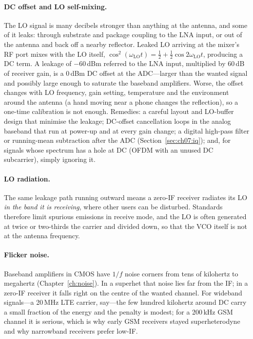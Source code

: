 \paragraph{DC offset and LO self-mixing.} The LO signal is many decibels stronger than anything at
the antenna, and some of it leaks: through substrate and package coupling to the LNA input, or out of
the antenna and back off a nearby reflector. Leaked LO arriving at the mixer's RF port mixes with the
LO itself, $\cos^2(\omega_{\text{LO}}t)=\tfrac12+\tfrac12\cos2\omega_{\text{LO}}t$, producing a DC
term. A leakage of $-60$\,dBm referred to the LNA input, multiplied by 60\,dB of receiver gain, is a
0\,dBm DC offset at the ADC---larger than the wanted signal and possibly large enough to saturate the
baseband amplifiers. Worse, the offset changes with LO frequency, gain setting, temperature and the
environment around the antenna (a hand moving near a phone changes the reflection), so a one-time
calibration is not enough. Remedies: a careful layout and LO-buffer design that minimise the leakage;
DC-offset cancellation loops in the analog baseband that run at power-up and at every gain change;
a digital high-pass filter or running-mean subtraction after the ADC (Section~\ref{sec:ch07:iq}); and,
for signals whose spectrum has a hole at DC (OFDM with an unused DC subcarrier), simply ignoring it.

\paragraph{LO radiation.} The same leakage path running outward means a zero-IF receiver radiates its
LO \emph{in the band it is receiving}, where other users can be disturbed. Standards therefore limit
spurious emissions in receive mode, and the LO is often generated at twice or two-thirds the carrier
and divided down, so that the VCO itself is not at the antenna frequency.

\paragraph{Flicker noise.} Baseband amplifiers in CMOS have $1/f$ noise corners from tens of
kilohertz to megahertz (Chapter~\ref{ch:noise}). In a superhet that noise lies far from the IF; in a
zero-IF receiver it falls right on the centre of the wanted channel. For wideband signals---a 20\,MHz
LTE carrier, say---the few hundred kilohertz around DC carry a small fraction of the energy and the
penalty is modest; for a 200\,kHz GSM channel it is serious, which is why early GSM receivers stayed
superheterodyne and why narrowband receivers prefer low-IF.

